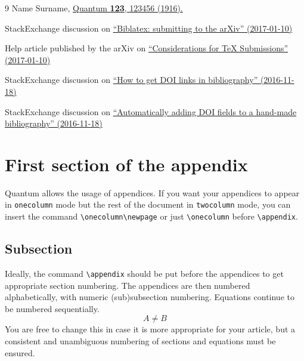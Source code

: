 \documentclass[a4paper,twocolumn,11pt,accepted=2017-05-09]{quantumarticle}
\begin{document}

\begin{thebibliography}{9}
  Name Surname,
  \href{https://doi.org/10.22331/
        idonotexist}{Quantum
        \textbf{123}, 123456 (1916).}

  StackExchange discussion on \href{http://tex.stackexchange.com/questions/26990/biblatex-submitting-to-the-arxiv}{``Biblatex: submitting to the arXiv'' (2017-01-10)}

  Help article published by the arXiv on \href{https://arxiv.org/help/submit_tex}{``Considerations for TeX Submissions'' (2017-01-10)}

  StackExchange discussion on \href{http://tex.stackexchange.com/questions/3802/how-to-get-doi-links-in-bibliography}{``How to get DOI links in bibliography'' (2016-11-18)}

  StackExchange discussion on \href{http://tex.stackexchange.com/questions/6810/automatically-adding-doi-fields-to-a-hand-made-bibliography}{``Automatically adding DOI fields to a hand-made bibliography'' (2016-11-18)}
\end{thebibliography}



\onecolumn
\appendix

\section{First section of the appendix}
Quantum allows the usage of appendices.
If you want your appendices to appear in \texttt{onecolumn} mode but the rest of the
document in \texttt{twocolumn} mode, you can insert the command
\texttt{\textbackslash{}onecolumn\textbackslash{}newpage} or just
\texttt{\textbackslash{}onecolumn} before
\texttt{\textbackslash{}appendix}.


\subsection{Subsection}
Ideally, the command \texttt{\textbackslash{}appendix} should be put before the appendices to get appropriate section numbering.
The appendices are then numbered alphabetically, with numeric (sub)subsection numbering.
Equations continue to be numbered sequentially.
\begin{equation}
  A \neq B
\end{equation}
You are free to change this in case it is more appropriate for your article, but a consistent and unambiguous numbering of sections and equations must be ensured.
\end{document}
